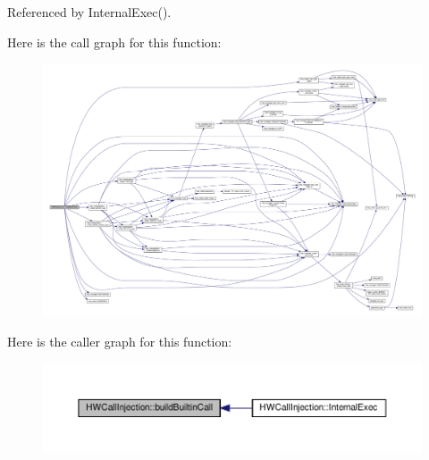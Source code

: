 Referenced by Internal\+Exec().

Here is the call graph for this function\+:
\nopagebreak
\begin{figure}[H]
\begin{center}
\leavevmode
\includegraphics[width=350pt]{d8/d90/classHWCallInjection_a384a02ea581f0406948fe6823fe35b8a_cgraph}
\end{center}
\end{figure}
Here is the caller graph for this function\+:
\nopagebreak
\begin{figure}[H]
\begin{center}
\leavevmode
\includegraphics[width=350pt]{d8/d90/classHWCallInjection_a384a02ea581f0406948fe6823fe35b8a_icgraph}
\end{center}
\end{figure}
\mbox{\label{classHWCallInjection_a454d28bb8bc73465ccfb57e515717f7b}} 
